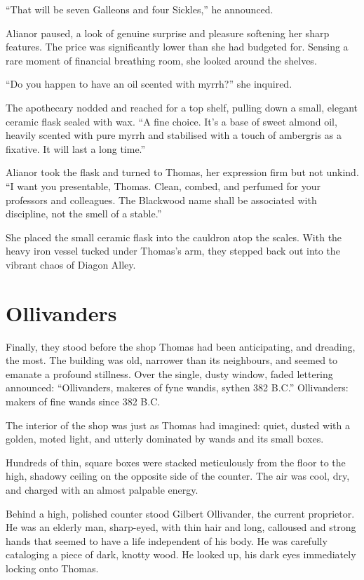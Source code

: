 \enquote{That will be seven Galleons and four Sickles,} he announced.

Alianor paused, a look of genuine surprise and pleasure softening her sharp features. The price was significantly lower than she had budgeted for. Sensing a rare moment of financial breathing room, she looked around the shelves.

\enquote{Do you happen to have an oil scented with myrrh?} she inquired.

The apothecary nodded and reached for a top shelf, pulling down a small, elegant ceramic flask sealed with wax. \enquote{A fine choice. It's a base of sweet almond oil, heavily scented with pure myrrh and stabilised with a touch of ambergris as a fixative. It will last a long time.}

Alianor took the flask and turned to Thomas, her expression firm but not unkind. \enquote{I want you presentable, Thomas. Clean, combed, and perfumed for your professors and colleagues. The Blackwood name shall be associated with discipline, not the smell of a stable.}

She placed the small ceramic flask into the cauldron atop the scales. With the heavy iron vessel tucked under Thomas's arm, they stepped back out into the vibrant chaos of Diagon Alley.

\section*{Ollivanders}

Finally, they stood before the shop Thomas had been anticipating, and dreading, the most. The building was old, narrower than its neighbours, and seemed to emanate a profound stillness. Over the single, dusty window, faded lettering announced: \enquote{Ollivanders, makeres of fyne wandis, sythen 382 B.C.} Ollivanders: makers of fine wands since 382 B.C.

The interior of the shop was just as Thomas had imagined: quiet, dusted with a golden, moted light, and utterly dominated by wands and its small boxes.

Hundreds of thin, square boxes were stacked meticulously from the floor to the high, shadowy ceiling on the opposite side of the counter. The air was cool, dry, and charged with an almost palpable energy.

Behind a high, polished counter stood Gilbert Ollivander, the current proprietor. He was an elderly man, sharp-eyed, with thin hair and long, calloused and strong hands that seemed to have a life independent of his body. He was carefully cataloging a piece of dark, knotty wood. He looked up, his dark eyes immediately locking onto Thomas.

